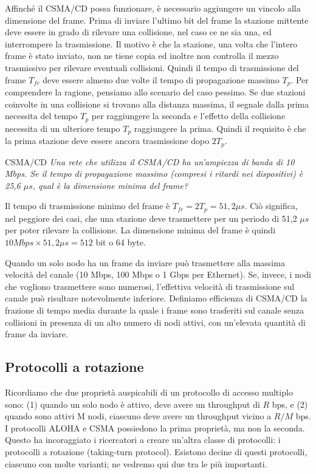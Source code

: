 Affinché il CSMA/CD possa funzionare, è necessario aggiungere un vincolo alla dimensione del frame. Prima di inviare l'ultimo bit del frame la stazione mittente deve essere in grado di rilevare una collisione, nel caso ce ne sia una, ed interrompere la trasmissione. Il motivo è che la stazione, una volta che l'intero frame è stato inviato, non ne tiene copia ed inoltre non controlla il mezzo trasmissivo per rilevare eventuali collisioni. Quindi il tempo di trasmissione del frame $T_{fr}$ deve essere almeno due volte il tempo di propagazione massimo $T_{p}$. Per comprendere la ragione, pensiamo allo scenario del caso pessimo. Se due stazioni coinvolte in una collisione si trovano alla distanza massima, il segnale dalla prima necessita del tempo $T_{p}$ per raggiungere la seconda e l'effetto della collisione necessita di un ulteriore tempo $T_{p}$ raggiungere la prima. Quindi il requisito è che la prima stazione deve essere ancora trasmissione dopo $2T_{p}$.

\begin{Example}{CSMA/CD}{}
    \textit{Una rete che utilizza il CSMA/CD ha un'ampiezza di banda di 10 Mbps. Se il tempo di propagazione massimo (compresi i ritardi nei dispositivi) è 25,6 $\mu s$, qual è la dimensione minima del frame?}

    Il tempo di trasmissione minimo del frame è $T_{fr} = 2T_{p} = 51,2\mu s$. Ciò significa, nel peggiore dei casi, che una stazione deve trasmettere per un periodo di 51,2 $\mu s$ per poter rilevare la collisione. La dimensione minima del frame è quindi $10 Mbps\times 51,2 \mu s = 512$ bit o 64 byte.
\end{Example}

Quando un solo nodo ha un frame da inviare può trasmettere alla massima velocità del canale (10 Mbps, 100 Mbps o 1 Gbps per Ethernet). Se, invece, i nodi che vogliono trasmettere sono numerosi, l’effettiva velocità di trasmissione sul canale può risultare notevolmente inferiore. Definiamo efficienza di CSMA/CD la frazione di tempo media durante la quale i frame sono trasferiti sul canale senza collisioni in presenza di un alto numero di nodi attivi, con un’elevata quantità di frame da inviare.

\subsection{Protocolli a rotazione}
Ricordiamo che due proprietà auspicabili di un protocollo di accesso multiplo sono: (1) quando un solo nodo è attivo, deve avere un throughput di $R$ bps, e (2) quando sono attivi M nodi, ciascuno deve avere un throughput vicino a $R/M$ bps. I protocolli ALOHA e CSMA possiedono la prima proprietà, ma non la seconda. Questo ha incoraggiato i ricercatori a creare un’altra classe di protocolli: i protocolli a rotazione (taking-turn protocol). Esistono decine di questi protocolli, ciascuno con molte varianti; ne vedremo qui due tra le più importanti. 

